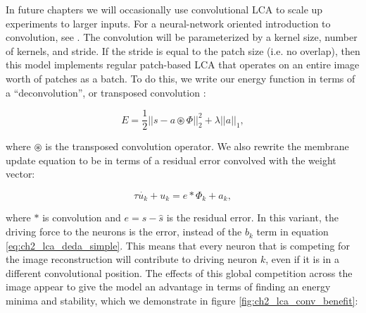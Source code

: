 In future chapters we will occasionally use convolutional LCA to scale up experiments to larger inputs. For a neural-network oriented introduction to convolution, see \parencite{goodfellow2019deep}. The convolution will be parameterized by a kernel size, number of kernels, and stride. If the stride is equal to the patch size (i.e. no overlap), then this model implements regular patch-based LCA that operates on an entire image worth of patches as a batch. To do this, we write our energy function in terms of a ``deconvolution'', or transposed convolution \cite{zeiler2010deconvolutional}:

\begin{equation}
    E = \frac{1}{2} || s - a \circledast \Phi ||^{2}_{2} + \lambda ||a||_{1},
\end{equation}

\noindent where $\circledast$ is the transposed convolution operator. We also rewrite the membrane update equation to be in terms of a residual error convolved with the weight vector:

\begin{equation}\label{eq:ch2_conv_lca_dynamics}
   \tau \dot{u_{k}} + u_{k} = e \ast \Phi_{k} + a_{k},
\end{equation}

\noindent where $\ast$ is convolution and $e = s - \hat{s}$ is the residual error. In this variant, the driving force to the neurons is the error, instead of the $b_{k}$ term in equation \ref{eq:ch2_lca_deda_simple}. This means that every neuron that is competing for the image reconstruction will contribute to driving neuron $k$, even if it is in a different convolutional position. The effects of this global competition across the image appear to give the model an advantage in terms of finding an energy minima and stability, which we demonstrate in figure \ref{fig:ch2_lca_conv_benefit}:

